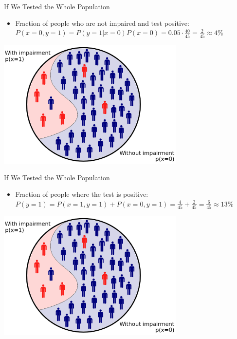 \documentclass{beamer}
\begin{document}
\begin{frame}{If We Tested the Whole Population}
  \begin{itemize}
    \item Fraction of people who are not impaired and test positive:
      \(
        P(x=0, y=1) = P(y = 1|x = 0)P(x = 0) = 0.05 \cdot \frac{40}{45} = \frac{2}{45} \approx 4\%
      \)
  \end{itemize}
  \begin{center}
    \includegraphics[width=0.7\textwidth]{whole_population.png}
  \end{center}
\end{frame}

\begin{frame}{If We Tested the Whole Population}
  \begin{itemize}
    \item Fraction of people where the test is positive:
      \(
        P(y=1) = P(x=1, y=1) + P(x=0, y=1) = \frac{4}{45} + \frac{2}{45} = \frac{6}{45} \approx 13\%
      \)
  \end{itemize}
  \begin{center}
    \includegraphics[width=0.7\textwidth]{whole_population.png}
  \end{center}
\end{frame}
\end{document}
